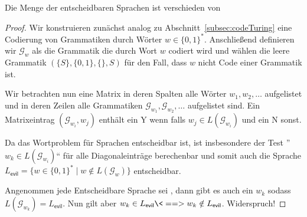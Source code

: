 \begin{Satz}
 Die Menge der entscheidbaren Sprachen ist verschieden von 
\end{Satz}
\begin{proof}
 Wir konstruieren zunächst analog zu Abschnitt~\ref{subsec:codeTuring} eine Codierung von Grammatiken durch Wörter $w\in\{0,1\}^*$.
 Anschließend definieren wir $\mathcal{G}_w$ als die Grammatik die durch Wort $w$ codiert wird und wählen die leere Grammatik
 $(\{S\}, \{0,1\}, \{\}, S)$
 für den Fall, dass $w$ nicht Code einer Grammatik ist.
 
 Wir betrachten nun eine Matrix in deren Spalten alle Wörter $w_1,w_2,\ldots$
 aufgelistet und in deren Zeilen alle Grammatiken $\mathcal{G}_{w_1},\mathcal{G}_{w_2},\ldots$ aufgelistet sind.
 Ein Matrixeintrag $(\mathcal{G}_{w_i}, w_j)$ enthält ein Y wenn falls $w_j\in L(\mathcal{G}_{w_i})$ und ein N sonst.
 
 Da das Wortproblem für  Sprachen entscheidbar ist, ist insbesondere der Test ''$w_k\in L(\mathcal{G}_{w_i})$``
 für alle Diagonaleinträge berechenbar und somit auch die Sprache $L_\mathsf{evil}= \{w \in\{0,1\}^* \mid w\notin L(\mathcal{G}_w)\}$ entscheidbar.
 
 Angenommen jede Entscheidbare Sprache sei , dann gibt es auch ein $w_k$ sodass $L(\mathcal{G}_{w_k})=L_\mathsf{evil}$.
 Nun gilt aber $w_k\in L_\mathsf{evil} \<==> w_k\notin L_\mathsf{evil}$. Widerspruch!
\end{proof}

